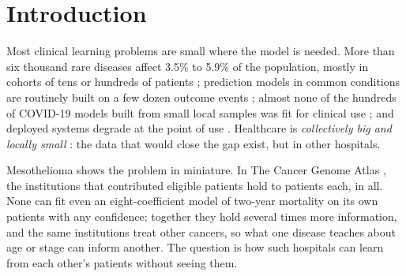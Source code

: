 \documentclass[acmsmall,screen,review]{acmart}
\theoremstyle{acmdefinition}
\begin{document}


\maketitle
\renewcommand{\shortauthors}{Sim\~{o}es et al.}


\section{Introduction}\label{sec:intro}

Most clinical learning problems are small where the model is needed. More than six thousand rare diseases affect 3.5\% to 5.9\% of the population, mostly in cohorts of tens or hundreds of patients \cite{nguengangwakap2020estimating,schaefer2020use}; prediction models in common conditions are routinely built on a few dozen outcome events \cite{peduzzi1996simulation,riley2019minimumsample}; almost none of the hundreds of COVID-19 models built from small local samples was fit for clinical use \cite{roberts2021common,wynants2020prediction}; and deployed systems degrade at the point of use \cite{wong2021external,zech2018variable}. Healthcare is \emph{collectively big and locally small} \cite{simoes2026collectively}: the data that would close the gap exist, but in other hospitals.

Mesothelioma shows the problem in miniature. In The Cancer Genome Atlas \cite{weinstein2013cancer}, the \SimMesoHosp{} institutions that contributed eligible patients hold \SimMesoMin{} to \SimMesoMax{} patients each, \SimMesoPatients{} in all. None can fit even an eight-coefficient model of two-year mortality on its own patients with any confidence; together they hold several times more information, and the same institutions treat other cancers, so what one disease teaches about age or stage can inform another. The question is how such hospitals can learn from each other's patients without seeing them.
\end{document}
